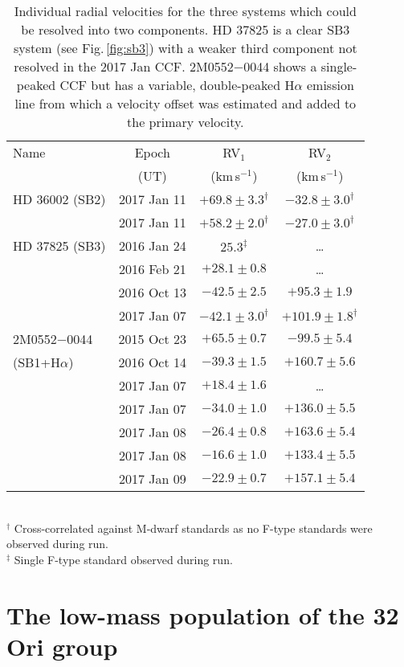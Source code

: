 \documentclass[usenatbib]{mnras}
\newcommand{\kms}{\textrm{km\,s$^{-1}$}}
\begin{document}
\begin{table}
\caption[]{Individual radial velocities for the three systems which could be resolved into two components. HD 37825 is a clear SB3 system (see Fig.\,\ref{fig:sb3}) with a weaker third component not resolved in the 2017 Jan CCF.  2M0552$-$0044 shows a single-peaked CCF but has a variable, double-peaked H$\alpha$ emission line from which a velocity offset was estimated and added to the primary velocity.}\label{tab:sb2}
\begin{flushleft}
\begin{tabular}{l c c c}
\hline
Name   &   Epoch   &  RV$_{1}$ & RV$_{2}$\\
 &  (UT) & (\kms) & (\kms)\\
\hline
HD 36002 (SB2) & 2017 Jan 11 & $+69.8\pm3.3^{\dagger}$ & $-32.8\pm3.0^{\dagger}$\\
& 2017 Jan 11 & $+58.2\pm2.0^{\dagger}$ & $-27.0\pm3.0^{\dagger}$\\[2mm]
HD 37825 (SB3) & 2016 Jan 24 &	$25.3^{\ddag}$ & \dots \\
&  2016 Feb 21 &	$+28.1\pm0.8$ & \dots \\
& 2016 Oct 13 & $-42.5\pm2.5$ & $+95.3\pm1.9$\\
& 2017 Jan 07 & $-42.1\pm3.0^{\dagger}$ & $+101.9\pm1.8^{\dagger}$\\[2mm]
2M0552$-$0044 & 2015 Oct 23 &	$+65.5\pm	0.7$ & $-99.5\pm5.4$\\
(SB1+H$\alpha$) & 2016 Oct 14 &	$-39.3\pm	1.5$ & $+160.7\pm5.6$\\
& 2017 Jan 07 & $+18.4\pm	1.6$ & \dots \\
& 2017 Jan 07 & $-34.0\pm	1.0$ & $+136.0\pm5.5$\\
& 2017 Jan 08 & $-26.4\pm	0.8$ & $+163.6\pm5.4$\\
& 2017 Jan 08 & $-16.6\pm	1.0$ & $+133.4\pm5.5$\\
& 2017 Jan 09 & $-22.9\pm	0.7$ & $+157.1\pm5.4$\\
\hline
\end{tabular}\\
$^{\dagger}$ Cross-correlated against M-dwarf standards as no F-type standards were observed during run.\\
$^{\ddag}$ Single F-type standard observed during run.
\end{flushleft}
\end{table}

\section{The low-mass population of the 32 Ori group}
\label{32_ori_low_mass_population}
\end{document}
